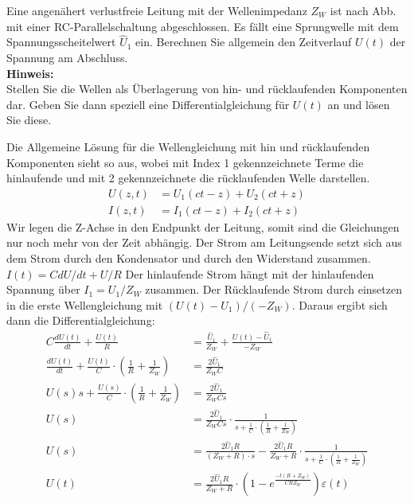 \begin{question}[section=5,subsection=53,name={Sprungwelle},difficulty=8,type=exercise,tags={20161207}]
	Eine angenähert verlustfreie Leitung mit der Wellenimpedanz $Z_W$ ist nach Abb. mit einer RC-Parallelschaltung abgeschlossen. Es fällt eine Sprungwelle mit dem Spannungsscheitelwert $ \hat U_1$ ein. Berechnen Sie allgemein den Zeitverlauf $ U(t)$ der Spannung am Abschluss.	
	\\ \textbf{Hinweis:}\\
	Stellen Sie die Wellen als Überlagerung von hin- und rücklaufenden Komponenten dar. Geben Sie dann speziell eine Differentialgleichung für $U(t)$ an und lösen Sie diese.
\end{question}
\begin{solution}
	Die Allgemeine Lösung für die Wellengleichung mit hin und rücklaufenden Komponenten sieht so aus, wobei mit Index 1 gekennzeichnete Terme die hinlaufende und mit 2 gekennzeichnete die rücklaufenden Welle darstellen.
	\begin{align}
		U(z,t)&=U_1 (ct -z) + U_2(ct +z)\\
		I(z,t) &= I_1 (ct -z) + I_2(ct +z)
	\end{align}
	Wir legen die Z-Achse in den Endpunkt der Leitung, somit sind die Gleichungen nur noch mehr von der Zeit abhängig. Der Strom am Leitungsende setzt sich aus dem Strom durch den Kondensator und durch den Widerstand zusammen. $I(t) = C dU/dt + U/R$ Der hinlaufende Strom hängt mit der hinlaufenden Spannung über $I_1 = U_1/Z_W$ zusammen. Der Rücklaufende Strom durch einsetzen in die erste Wellengleichung mit $(U(t) - U_1)/(-Z_W)$. Daraus ergibt sich dann die Differentialgleichung:
	\begin{align}
		C \frac{dU(t)}{dt} + \frac{U(t)}{R} &= \frac{\hat U_1}{Z_W} + \frac{U(t) - \hat U_1}{-Z_W}\\
		\frac{dU(t)}{dt} + \frac{U(t)}{C} \cdot \left ( \frac{1}{R} + \frac{1}{Z_W} \right )&= \frac{2 \hat U_1}{Z_W C}\\
		U(s)s + \frac{U(s)}{C} \cdot \left ( \frac{1}{R} + \frac{1}{Z_W} \right )&= \frac{2 \hat U_1}{Z_W C s}\\
		U(s) &= \frac{2 \hat U_1}{Z_W C s} \cdot \frac{1}{s+\frac{1}{C} \cdot \left ( \frac{1}{R} + \frac{1}{Z_W} \right )}\\
		U(s) &= \frac{2 \hat U_1 R}{(Z_W + R)\cdot s} - \frac{2 \hat U_1 R}{Z_W + R} \cdot \frac{1}{s+\frac{1}{C} \cdot \left ( \frac{1}{R} + \frac{1}{Z_W} \right )}\\
		U(t) &= \frac{2 \hat U_1 R}{Z_W + R} \cdot \left ( 1 - e^{\frac{-t(R +Z_W)}{C R Z_W}}\right )\varepsilon(t)
	\end{align}
\end{solution}